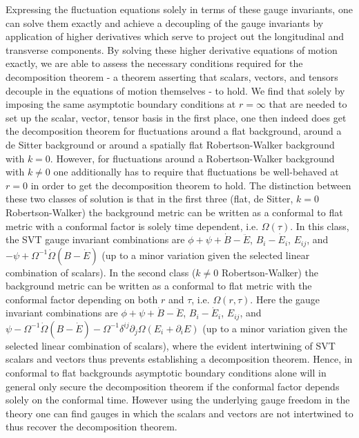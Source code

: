 Expressing the fluctuation equations solely in terms of these gauge invariants, one can solve them exactly and achieve a decoupling of the gauge invariants by application of higher derivatives which serve to project out the longitudinal and transverse components. By solving these higher derivative equations of motion exactly, we are able to assess the necessary conditions required for the decomposition theorem - a theorem asserting that scalars, vectors, and tensors decouple in the equations of motion themselves - to hold. We find that solely by imposing the same asymptotic boundary conditions at $r=\infty$ that are needed to set up the scalar, vector, tensor basis in the first place, one then indeed does get the decomposition theorem for fluctuations around a flat background, around a de Sitter background or around a spatially flat Robertson-Walker background with $k=0$. However, for fluctuations around a Robertson-Walker background with $k\neq 0$ one additionally has to require that fluctuations be well-behaved at $r=0$ in order to get the decomposition theorem to hold. The distinction between these two classes of solution is that in the first three (flat, de Sitter, $k=0$ Robertson-Walker) the background metric can be written as a conformal to flat metric with a conformal factor is solely time dependent, i.e. $\Omega(\tau)$. In this class, the SVT gauge invariant combinations are $\phi + \psi + \dot B - \ddot E$,  $B_i-\dot{E}_i$, $E_{ij}$, and $-\psi+\Omega^{-1}\dot{\Omega}(B-\dot{E})$ (up to a minor variation given the selected linear combination of scalars). In the second class ($k\neq 0$ Robertson-Walker) the background metric can be written as a conformal to flat metric with the conformal factor depending on both $r$ and $\tau$, i.e. $\Omega(r,\tau)$. Here the gauge invariant combinations are $\phi + \psi + \dot B - \ddot E$,  $B_i-\dot{E}_i$, $E_{ij}$, and $\psi-\Omega^{-1}\dot{\Omega}(B-\dot{E})-\Omega^{-1}\delta^{ij}\partial_j\Omega(E_i+\partial_iE)$ (up to a minor variation given the selected linear combination of scalars), where the evident intertwining of SVT scalars and vectors thus prevents establishing a decomposition theorem. Hence, in conformal to flat backgrounds asymptotic boundary conditions alone will in general only secure the decomposition theorem if the conformal factor depends solely on the conformal time. However using the underlying gauge freedom in the theory one can find gauges in which the scalars and vectors are not intertwined to thus recover the decomposition theorem.


